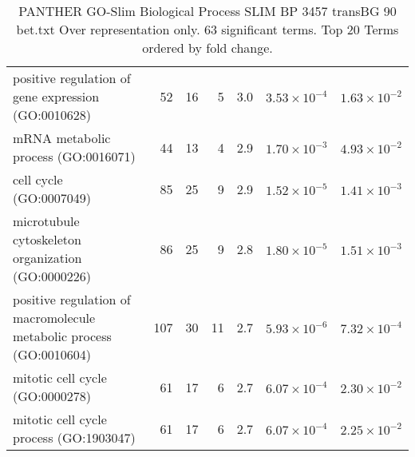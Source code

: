 \begin{table}[ht]
\begin{adjustbox}{width=\textwidth}
\begin{tabular}{lrrrrrr}
  positive regulation of gene expression (GO:0010628) & 52 & 16 & 5 & 3.0 & $3.53 \times 10^{-4}$ & $1.63 \times 10^{-2}$ \\ 
  mRNA metabolic process (GO:0016071) & 44 & 13 & 4 & 2.9 & $1.70 \times 10^{-3}$ & $4.93 \times 10^{-2}$ \\ 
  cell cycle (GO:0007049) & 85 & 25 & 9 & 2.9 & $1.52 \times 10^{-5}$ & $1.41 \times 10^{-3}$ \\ 
  microtubule cytoskeleton organization (GO:0000226) & 86 & 25 & 9 & 2.8 & $1.80 \times 10^{-5}$ & $1.51 \times 10^{-3}$ \\ 
  positive regulation of macromolecule metabolic process (GO:0010604) & 107 & 30 & 11 & 2.7 & $5.93 \times 10^{-6}$ & $7.32 \times 10^{-4}$ \\ 
  mitotic cell cycle (GO:0000278) & 61 & 17 & 6 & 2.7 & $6.07 \times 10^{-4}$ & $2.30 \times 10^{-2}$ \\ 
  mitotic cell cycle process (GO:1903047) & 61 & 17 & 6 & 2.7 & $6.07 \times 10^{-4}$ & $2.25 \times 10^{-2}$ \\ 
   \hline
\end{tabular}
\end{adjustbox}
\caption{PANTHER GO-Slim Biological Process SLIM BP 3457 transBG 90 bet.txt Over representation only. 63 significant terms. Top 20 Terms ordered by fold change. } 
\label{tab:PANTHER GO-Slim Biological Process SLIM BP 3457 transBG 90 bet.txt Over representation only. 63 significant terms. Top 20 Terms ordered by fold change. }
\end{table}


